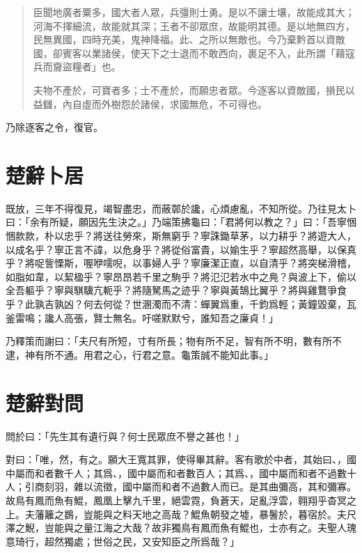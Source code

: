 \begin{quotation}
臣聞地廣者粟多，國大者人眾，兵彊則士勇。是以不讓士壤，故能成其大；河海不擇細流，故能就其深；王者不卻眾庶，故能明其德。是以地無四方，民無異國，四時充美，鬼神降福。此、之所以無敵也。今乃棄黔首以資敵國，卻賓客以業諸侯，使天下之士退而不敢西向，裹足不入，此所謂「藉寇兵而齎盜糧者」也。

夫物不產於，可寶者多；士不產於，而願忠者眾。今逐客以資敵國，損民以益讎，內自虛而外樹怨於諸侯，求國無危，不可得也。
\end{quotation}

乃除逐客之令，復官。

\theendnotes

\section[卜居\quad{\small 楚辭}]{{\normalsize 楚辭}\quad 卜居}
既放，三年不得復見，竭智盡忠，而蔽鄣於讒，心煩慮亂，不知所從。乃往見太卜曰：「余有所疑，願因先生決之。」乃端策拂龜曰：「君將何以教之？」曰：「吾寧悃悃款款，朴以忠乎？將送往勞來，斯無窮乎？寧誅鋤草茅，以力耕乎？將遊大人，以成名乎？寧正言不諱，以危身乎？將從俗富貴，以媮生乎？寧超然高舉，以保真乎？將哫訾慄斯，喔咿嚅唲，以事婦人乎？寧廉潔正直，以自清乎？將突梯滑稽，如脂如韋，以絜楹乎？寧昂昂若千里之駒乎？將氾氾若水中之鳧？與波上下，偷以全吾軀乎？寧與騏驥亢軛乎？將隨駑馬之迹乎？寧與黃鵠比翼乎？將與雞鶩爭食乎？此孰吉孰凶？何去何從？世溷濁而不清：蟬翼爲重，千鈞爲輕；黃鐘毀棄，瓦釜雷鳴；讒人高張，賢士無名。吁嗟默默兮，誰知吾之廉貞！」

乃釋策而謝曰：「夫尺有所短，寸有所長；物有所不足，智有所不明，數有所不逮，神有所不通。用君之心，行君之意。龜策誠不能知此事。」

\section[宋玉對楚王問\quad{\small 楚辭}]{{\normalsize 楚辭}\quad {}對問}
問於曰：「先生其有遺行與？何士民眾庶不譽之甚也！」

對曰：「唯，然，有之。願大王寬其罪，使得畢其辭。客有歌於中者，其始曰、，國中屬而和者數千人；其爲、，國中屬而和者數百人；其爲、，國中屬而和者不過數十人；引商刻羽，雜以流徵，國中屬而和者不過數人而已。是其曲彌高，其和彌寡。故鳥有鳳而魚有鯤，鳳凰上擊九千里，絕雲霓，負蒼天，足亂浮雲，翱翔乎杳冥之上。夫藩籬之鷃，豈能與之料天地之高哉？鯤魚朝發之墟，暴鬐於，暮宿於。夫尺澤之鯢，豈能與之量江海之大哉？故非獨鳥有鳳而魚有鯤也，士亦有之。夫聖人瑰意琦行，超然獨處；世俗之民，又安知臣之所爲哉？」

